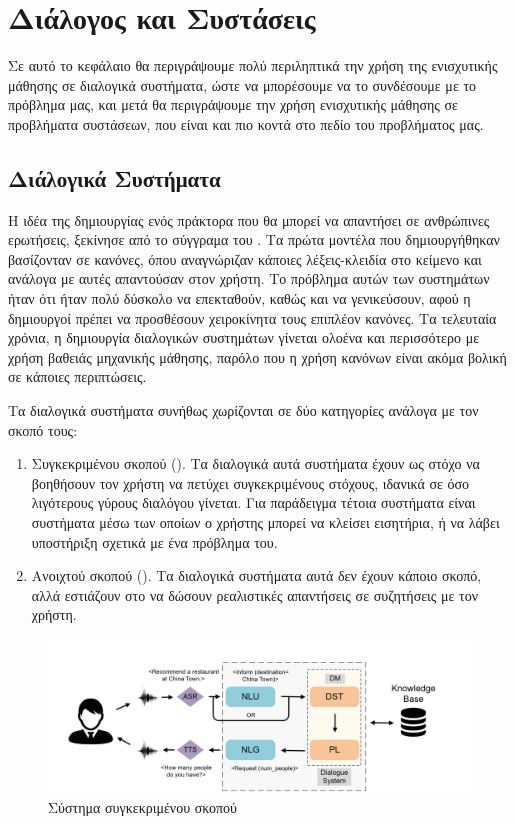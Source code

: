 \chapter{Διάλογος και Συστάσεις}

Σε αυτό το κεφάλαιο θα περιγράψουμε πολύ περιληπτικά την χρήση της ενισχυτικής μάθησης σε διαλογικά συστήματα, ώστε να μπορέσουμε να το συνδέσουμε με το πρόβλημα μας, και μετά θα περιγράψουμε την χρήση ενισχυτικής μάθησης σε προβλήματα συστάσεων, που είναι και πιο κοντά στο πεδίο του προβλήματος μας.

\section{Διάλογικά Συστήματα}

Η ιδέα της δημιουργίας ενός πράκτορα που θα μπορεί να απαντήσει σε ανθρώπινες ερωτήσεις, ξεκίνησε από το σύγγραμα του  \cite{turing1950computing}. Τα πρώτα μοντέλα που δημιουργήθηκαν βασίζονταν σε κανόνες, όπου αναγνώριζαν κάποιες λέξεις-κλειδία στο κείμενο και ανάλογα με αυτές απαντούσαν στον χρήστη. Το πρόβλημα αυτών των συστημάτων ήταν ότι ήταν πολύ δύσκολο να επεκταθούν, καθώς και να γενικεύσουν, αφού η δημιουργοί πρέπει να προσθέσουν χειροκίνητα τους επιπλέον κανόνες. Τα τελευταία χρόνια, η δημιουργία διαλογικών συστημάτων γίνεται ολοένα και περισσότερο με χρήση βαθειάς μηχανικής μάθησης, παρόλο που η χρήση κανόνων είναι ακόμα βολική σε κάποιες περιπτώσεις.

Tα διαλογικά συστήματα συνήθως χωρίζονται σε δύο κατηγορίες ανάλογα με τον σκοπό τους:
\begin{enumerate}
    \item Συγκεκριμένου σκοπού (). Τα διαλογικά αυτά συστήματα έχουν ως στόχο να βοηθήσουν τον χρήστη να πετύχει συγκεκριμένους στόχους, ιδανικά σε όσο λιγότερους γύρους διαλόγου γίνεται. Για παράδειγμα τέτοια συστήματα είναι συστήματα μέσω των οποίων ο χρήστης μπορεί να κλείσει εισητήρια, ή να λάβει υποστήριξη σχετικά με ένα πρόβλημα του.
    \item Ανοιχτού σκοπού (). Τα διαλογικά συστήματα αυτά δεν έχουν κάποιο σκοπό, αλλά εστιάζουν στο να δώσουν ρεαλιστικές απαντήσεις σε συζητήσεις με τον χρήστη. 
\end{enumerate}

\begin{figure}
    \centering
    \includegraphics[width=\textwidth]{body_matter/dialogue_and_recommendations/images/task-based-dialogue-system.png}
    \caption{Σύστημα συγκεκριμένου σκοπού \cite{recent_advances_dl_2021}}
    \label{fig:task_based_system}
\end{figure}

